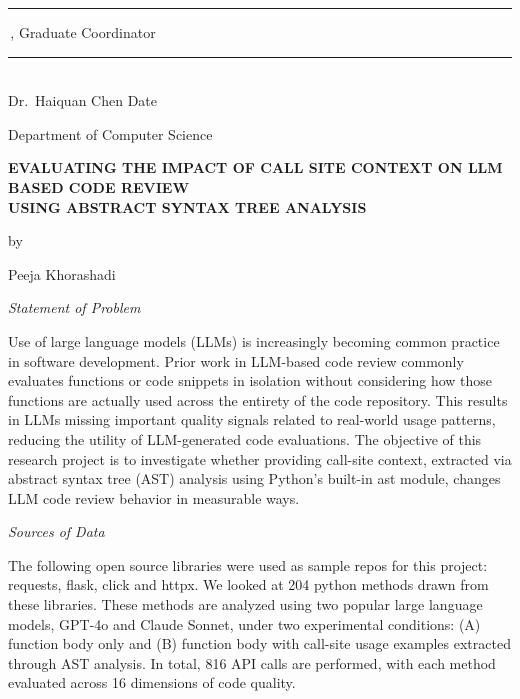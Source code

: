 \documentclass[12pt]{report}
\begin{document}
\noindent\rule{3in}{0.4pt}\,, Graduate Coordinator \hfill \rule{1.5in}{0.4pt} \\[4pt]
\noindent Dr.\ Haiquan Chen \hfill Date

\vspace{0.4in}

\noindent Department of Computer Science
\clearpage

\thispagestyle{fancy}
\begin{center}

{\large\bfseries
EVALUATING THE IMPACT OF CALL SITE CONTEXT ON LLM BASED CODE REVIEW \\[10pt]
USING ABSTRACT SYNTAX TREE ANALYSIS
}

\vspace{12pt}

by

\vspace{6pt}

Peeja Khorashadi
\end{center}

\vspace{0.3in}

\noindent\textit{Statement of Problem}

Use of large language models (LLMs) is increasingly becoming common practice in software development. Prior work in LLM-based code review commonly evaluates functions or code snippets in isolation without considering how those functions are actually used across the entirety of the code repository. This results in LLMs missing important quality signals related to real-world usage patterns, reducing the utility of LLM-generated code evaluations. The objective of this research project is to investigate whether providing call-site context, extracted via abstract syntax tree (AST) analysis using Python’s built-in ast module, changes LLM code review behavior in measurable ways.



\vspace{0.25in}

\noindent\textit{Sources of Data}

The following open source libraries were used as sample repos for this project: requests, flask, click and httpx. We looked at 204 python methods drawn from these libraries. These methods are analyzed using two popular large language models, GPT-4o and Claude Sonnet, under two experimental conditions: (A) function body only and (B) function body with call-site usage examples extracted through AST analysis. In total, 816 API calls are performed, with each method evaluated across 16 dimensions of code quality.
\end{document}
